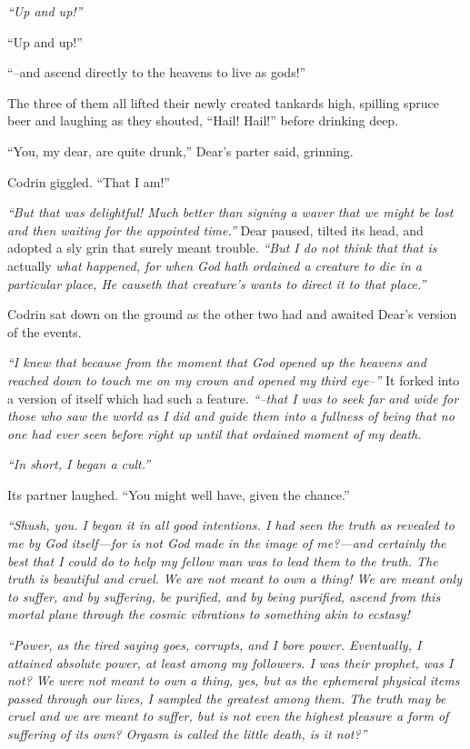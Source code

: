 \emph{``Up and up!''}

``Up and up!''

``--and ascend directly to the heavens to live as gods!''

The three of them all lifted their newly created tankards high, spilling spruce beer and laughing as they shouted, ``Hail! Hail!'' before drinking deep.

``You, my dear, are quite drunk,'' Dear's parter said, grinning.

Codrin giggled. ``That I am!''

\emph{``But that was delightful! Much better than signing a waver that we might be lost and then waiting for the appointed time.''} Dear paused, tilted its head, and adopted a sly grin that surely meant trouble. \emph{``But I do not think that that is} actually \emph{what happened, for when God hath ordained a creature to die in a particular place, He causeth that creature's wants to direct it to that place.''}

Codrin sat down on the ground as the other two had and awaited Dear's version of the events.

\emph{``I knew that because from the moment that God opened up the heavens and reached down to touch me on my crown and opened my third eye--''} It forked into a version of itself which had such a feature. \emph{``--that I was to seek far and wide for those who saw the world as I did and guide them into a fullness of being that no one had ever seen before right up until that ordained moment of my death.}

\emph{``In short, I began a cult.''}

Its partner laughed. ``You might well have, given the chance.''

\emph{``Shush, you. I began it in all good intentions. I had seen the truth as revealed to me by God itself---for is not God made in the image of me?---and certainly the best that I could do to help my fellow man was to lead them to the truth. The truth is beautiful and cruel. We are not meant to own a thing! We are meant only to suffer, and by suffering, be purified, and by being purified, ascend from this mortal plane through the cosmic vibrations to something akin to ecstasy!}

\emph{``Power, as the tired saying goes, corrupts, and I bore power. Eventually, I attained absolute power, at least among my followers. I was their prophet, was I not? We were not meant to own a thing, yes, but as the ephemeral physical items passed through our lives, I sampled the greatest among them. The truth may be cruel and we are meant to suffer, but is not even the highest pleasure a form of suffering of its own? Orgasm is called the little death, is it not?''}

